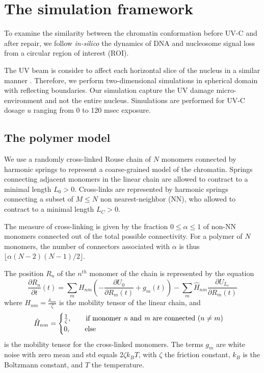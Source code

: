 \documentclass[12pt]{article}
\begin{document}
\section{The simulation framework}
	To examine the similarity between the chromatin conformation before UV-C and after repair, we follow \textit{in-silico} the dynamics of DNA and nucleosome signal loss from a circular region of interest (ROI).
	
	The UV beam is consider to affect each horizontal slice of the nucleus in a similar manner \cite{adam2015imaging}. Therefore, we perform two-dimensional simulations in spherical domain with reflecting boundaries. Our simulation capture the UV damage micro-environment and not the entire nucleus. Simulations are performed for UV-C dosage $u$ ranging from 0 to 120 msec exposure.  

	
	\subsection{The polymer model}
	We use a randomly cross-linked Rouse chain of $N$ monomers connected by harmonic springs \cite{doi1988theory} to represent a coarse-grained model of the chromatin. Springs connecting adjacent monomers in the linear chain are allowed to contract to a minimal length $L_0>0$. Cross-links are represented by harmonic springs connecting a subset of $M\leq N$ non nearest-neighbor (NN), who allowed to contract to a minimal length $L_C>0$.  
	
	The measure of cross-linking is given by the fraction $0\leq \alpha\leq 1$ of non-NN monomers connected out of the total possible connectivity. For a polymer of $N$ monomers, the number of connectors associated with $\alpha$ is thus 
	$\lfloor\alpha(N-2)(N-1)/2\rfloor$.
		
	The position $R_n$ of the $n^{th}$ monomer of the chain is represented by the equation 
	\begin{equation}
	\frac{\partial R_n}{\partial t}(t) = \sum_m H_{nm}\left(-\frac{\partial U_0}{\partial R_m(t)}+g_m(t)\right) -\sum_m \hat{H}_{nm}\frac{\partial U_{L_c}}{\partial R_m (t)}
	\end{equation}
	where $H_{nm}=\frac{\delta_{nm}}{\zeta}$ is the mobility tensor of the linear chain, and 	
	\begin{equation}
	\hat{H}_{nm}= \begin{cases}
	\frac{1}{\zeta},\qquad 
	\text{if monomer \textit{n} and \textit{m} are connected ($n\neq m$)}\\
	0,\qquad \text{else}
	\end{cases}
	\end{equation}
	is the mobility tensor for the cross-linked monomers. 
	The terms $g_m$ are white noise with zero mean and std equals $2\zeta k_BT$, with $\zeta$ the friction constant, $k_B$ is the Boltzmann constant, and $T$ the temperature.  
	
\end{document}

